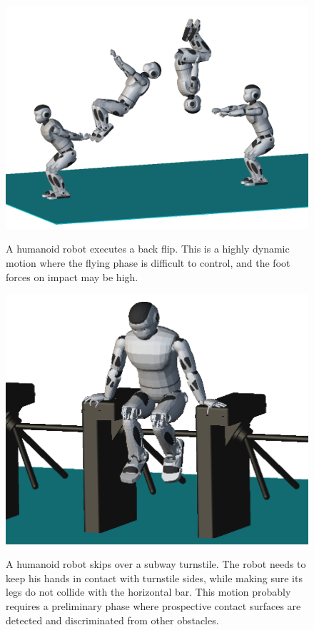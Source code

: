 \begin{figure}
  \centering
      {\includegraphics[width = 0.8\linewidth]
        {src/chap4-conclusion/romeo-back-flip.png}}
      \caption{A humanoid robot executes a back flip. This is a highly
        dynamic motion where the flying phase is difficult to control,
        and the foot forces on impact may be high.}
      \label{fig:chap4-romeo-back-flip}
\end{figure}

\begin{figure}
  \centering
      {\includegraphics[width = 0.8\linewidth]
        {src/chap4-conclusion/romeo-turnstile.png}}
      \caption{A humanoid robot skips over a subway turnstile. The
        robot needs to keep his hands in contact with turnstile sides,
        while making sure its legs do not collide with the horizontal
        bar. This motion probably requires a preliminary phase where
        prospective contact surfaces are detected and discriminated
        from other obstacles.}
      \label{fig:chap4-romeo-turnstile}
\end{figure}


